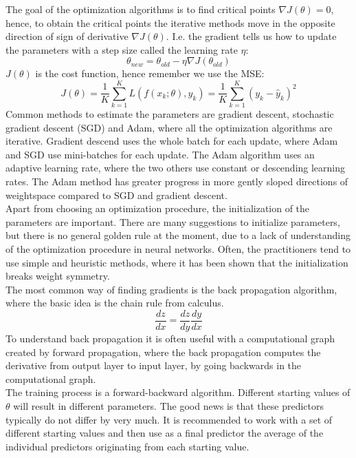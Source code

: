 The goal of the optimization algorithms is to find critical points $\nabla J(\theta)=0$, hence, to obtain the critical points the iterative methods move in the opposite direction of sign of derivative $\nabla J(\theta)$. I.e. the gradient tells us how to update the parameters with a step size called the learning rate $\eta$:
$$\theta_{new}=\theta_{old} - \eta \nabla J(\theta_{old}) $$
$J(\theta)$ is the cost function, hence remember we use the MSE:
$$J(\theta)= \frac{1}{K}\sum_{k=1}^{K} L(f(x_k;\theta),y_k)=\frac{1}{K}\sum_{k=1}^{K} (y_k-\hat{y}_k)^2$$
Common methods to estimate the parameters are gradient descent, stochastic gradient descent (SGD) and Adam, where all the optimization algorithms are iterative. Gradient descend uses the whole batch for each update, where Adam and SGD use mini-batches for each update. The Adam algorithm uses an adaptive learning rate, where the two others use constant or descending learning rates. The Adam method has greater progress in more gently sloped directions of weightspace compared to SGD and gradient descent. \\

Apart from choosing an optimization procedure, the initialization of the parameters are important. There are many suggestions to initialize parameters, but there is no general golden rule at the moment, due to a lack of understanding of the optimization procedure in neural networks. Often, the practitioners tend to use simple and heuristic methods, where it has been shown that the initialization breaks weight symmetry.\\

The most common way of finding gradients is the back propagation algorithm, where the basic idea is the chain rule from calculus.
$$\frac{dz}{dx}= \frac{dz}{dy} \frac{dy}{dx}$$
To understand back propagation it is often useful with a computational graph created by forward propagation, where the back propagation computes the derivative from output layer to input layer, by going backwards in the computational graph. \\

The training process is a forward-backward algorithm. Different starting values of $\theta$ will result in different parameters. The good news is that these predictors typically do not differ by very much. It is recommended to work with a set of different starting values and then use as a final predictor the average of the individual predictors originating from each starting value.

